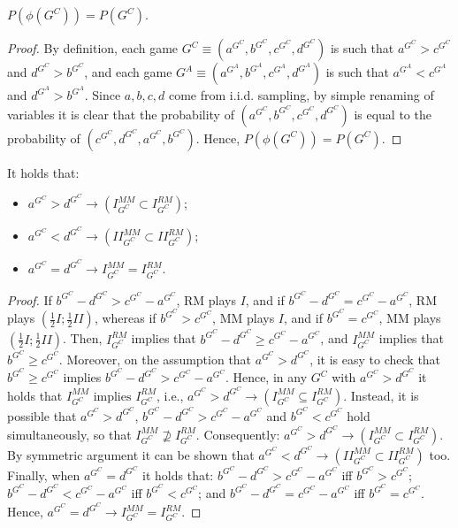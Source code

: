 \documentclass[fleqn,reqno,11pt]{article}
\begin{document}
\medskip{}

\begin{lemma}
$P(\phi(G^{C}))=P(G^{C})$.
\end{lemma}

\begin{proof}
By definition, each game $G^{C}\equiv(a^{G^{C}},b^{G^{C}},c^{G^{C}},d^{G^{C}})$
is such that $a^{G^{C}}>c^{G^{C}}$ and $d^{G^{C}}>b^{G^{C}}$, and
each game $G^{A}\equiv(a^{G^{A}},b^{G^{A}},c^{G^{A}},d^{G^{A}})$
is such that $a^{G^{A}}<c^{G^{A}}$ and $d^{G^{A}}>b^{G^{A}}$. Since
$a,b,c,d$ come from i.i.d. sampling, by simple renaming of variables
it is clear that the probability of $(a^{G^{C}},b^{G^{C}},c^{G^{C}},d^{G^{C}})$
is equal to the probability of $(c^{G^{C}},d^{G^{C}},a^{G^{C}},b^{G^{C}})$.
Hence, $P(\phi(G^{C}))=P(G^{C})$.
\end{proof}

\medskip{}

\begin{lemma}
It holds that:
\begin{itemize}
\item $a^{G^{C}}>d^{G^{C}}\rightarrow(I_{G^{C}}^{MM}\subset I_{G^{C}}^{RM})$;
\item $a^{G^{C}}<d^{G^{C}}\rightarrow(II_{G^{C}}^{MM}\subset II_{G^{C}}^{RM})$;
\item $a^{G^{C}}=d^{G^{C}}\rightarrow I_{G^{C}}^{MM}=I_{G^{C}}^{RM}$.
\end{itemize}
\end{lemma}

\begin{proof}
If $b^{G^{C}}-d^{G^{C}}>c^{G^{C}}-a^{G^{C}}$, RM plays
$I$, and if $b^{G^{C}}-d^{G^{C}}=c^{G^{C}}-a^{G^{C}}$, RM plays
$(\frac{1}{2}I;\frac{1}{2}II)$, whereas if $b^{G^{C}}>c^{G^{C}}$,
MM plays $I$, and if $b^{G^{C}}=c^{G^{C}}$, MM plays $(\frac{1}{2}I;\frac{1}{2}II)$.
Then, $I_{G^{C}}^{RM}$ implies that $b^{G^{C}}-d^{G^{C}}\geq c^{G^{C}}-a^{G^{C}}$,
and $I_{G^{C}}^{MM}$ implies that $b^{G^{C}}\geq c^{G^{C}}$. Moreover,
on the assumption that $a^{G^{C}}>d^{G^{C}}$, it is easy to check
that $b^{G^{C}}\geq c^{G^{C}}$ implies $b^{G^{C}}-d^{G^{C}}>c^{G^{C}}-a^{G^{C}}$.
Hence, in any $G^{C}$ with $a^{G^{C}}>d^{G^{C}}$ it holds that $I_{G^{C}}^{MM}\mbox{ implies }I_{G^{C}}^{RM}$,
i.e., $a^{G^{C}}>d^{G^{C}}\rightarrow(I_{G^{C}}^{MM}\subseteq I_{G^{C}}^{RM})$.
Instead, it is possible that $a^{G^{C}}>d^{G^{C}}$, $b^{G^{C}}-d^{G^{C}}>c^{G^{C}}-a^{G^{C}}$
and $b^{G^{C}}<c^{G^{C}}$ hold simultaneously, so that $I_{G^{C}}^{MM}\nsupseteq I_{G^{C}}^{RM}$.
Consequently: $a^{G^{C}}>d^{G^{C}}\rightarrow(I_{G^{C}}^{MM}\subset I_{G^{C}}^{RM})$.
By symmetric argument it can be shown that $a^{G^{C}}<d^{G^{C}}\rightarrow(II_{G^{C}}^{MM}\subset II_{G^{C}}^{RM})$
too. \\
Finally, when $a^{G^{C}}=d^{G^{C}}$ it holds that: $b^{G^{C}}-d^{G^{C}}>c^{G^{C}}-a^{G^{C}}$
iff $b^{G^{C}}>c^{G^{C}}$; $b^{G^{C}}-d^{G^{C}}<c^{G^{C}}-a^{G^{C}}$
iff $b^{G^{C}}<c^{G^{C}}$; and $b^{G^{C}}-d^{G^{C}}=c^{G^{C}}-a^{G^{C}}$
iff $b^{G^{C}}=c^{G^{C}}$. Hence, $a^{G^{C}}=d^{G^{C}}\rightarrow I_{G^{C}}^{MM}=I_{G^{C}}^{RM}$.
\end{proof}
\end{document}
